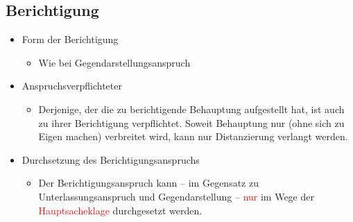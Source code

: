 \subsection{Berichtigung}
\begin{itemize}
    \item Form der Berichtigung
    \begin{itemize}
        \item Wie bei Gegendarstellungsanspruch
    \end{itemize}
    \item Anspruchsverpflichteter
    \begin{itemize}
        \item Derjenige, der die zu berichtigende Behauptung aufgestellt hat, ist auch zu ihrer Berichtigung verpflichtet. Soweit Behauptung nur (ohne sich zu Eigen machen) verbreitet wird, kann nur Distanzierung verlangt werden.
    \end{itemize}
    \item Durchsetzung des Berichtigungsanspruchs
    \begin{itemize}
        \item Der Berichtigungsanspruch kann – im Gegensatz zu Unterlassungsanspruch und Gegendarstellung – \textcolor{red}{nur} im Wege der \textcolor{red}{Hauptsacheklage} durchgesetzt werden.
    \end{itemize}
\end{itemize}
%
%
%
%
%
